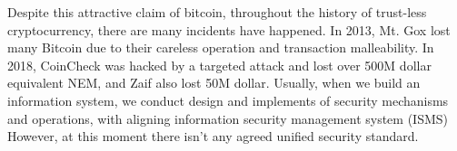 Despite this attractive claim of bitcoin,
%
throughout the history of trust-less cryptocurrency, there are many incidents have happened. In 2013, Mt. Gox lost many Bitcoin due to their careless operation and transaction malleability. In 2018, CoinCheck was hacked by a targeted attack and lost over 500M dollar equivalent NEM,
and Zaif also lost 50M dollar.
%
Usually, when we build an information system, we conduct design and implements of security mechanisms and operations, with aligning information security management system (ISMS)
However, at this moment
there isn't any agreed unified security standard.

